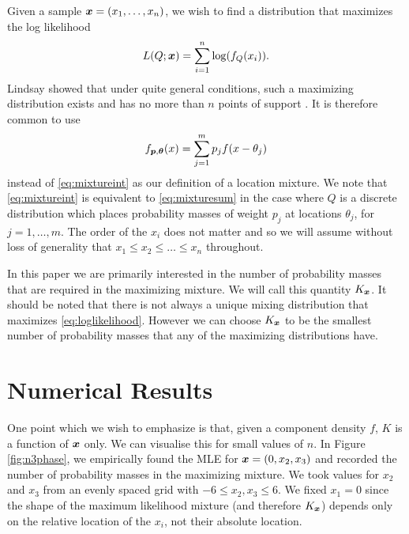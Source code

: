 		Given a sample ${\bm{{x}}} = (x_1,\dots,x_n)$, we wish to find a distribution that maximizes the log likelihood	
		\begin{equation}
			L(Q;{\bm{{x}}}) = \sum_{i = 1}^n \log(f_Q(x_i)).
		\label{eq:loglikelihood}
		\end{equation}
		Lindsay showed that under quite general conditions, such a maximizing distribution exists and has no more than $n$ points of support \cite{Lindsay1983-tf}. It is therefore common to use
		\begin{equation}
			f_{{\bm{{p}}},{\bm{{\theta}}}}(x) = \sum_{j = 1}^m p_j f(x - \theta_j)
		\label{eq:mixturesum}
		\end{equation}
		instead of \eqref{eq:mixtureint} as our definition of a location mixture. We note that \eqref{eq:mixtureint} is equivalent to \eqref{eq:mixturesum} in the case where $Q$ is a discrete distribution which places probability masses of weight $p_j$ at locations $\theta_j$, for $j = 1,\dots,m$. The order of the $x_i$ does not matter and so we will assume without loss of generality that $x_1 \leq x_2 \leq \dots \leq x_n$ throughout.
		
		In this paper we are primarily interested in the number of probability masses that are required in the maximizing mixture. We will call this quantity $K_{{\bm{{x}}}}$. It should be noted that there is not always a unique mixing distribution that maximizes \eqref{eq:loglikelihood}. However we can choose $K_{{\bm{{x}}}}$ to be the smallest number of probability masses that any of the maximizing distributions have.

\section{Numerical Results}
		One point which we wish to emphasize is that, given a component density $f$, $K$ is a function of ${\bm{{x}}}$ only. We can visualise this for small values of $n$. In Figure \ref{fig:n3phase}, we empirically found the MLE for ${\bm{{x}}} = (0,x_2,x_3)$ and recorded the number of probability masses in the maximizing mixture. We took values for $x_2$ and $x_3$ from an evenly spaced grid with $-6\leq x_2,x_3\leq 6$. We fixed $x_1 = 0$ since the shape of the maximum likelihood mixture (and therefore $K_{{\bm{{x}}}}$) depends only on the relative location of the $x_i$, not their absolute location.
		
